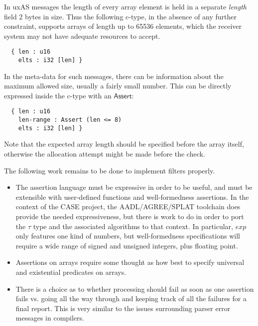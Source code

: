 \documentclass[svgnames]{llncs}
\newcommand{\konst}[1]{\ensuremath{\mathsf{#1}}}
\begin{document}
\begin{example}

In uxAS messages the length of every array element is held in a
separate \emph{length} field 2 bytes in size. Thus the following
c-type, in the absence of any further constraint, supports arrays of
length up to 65536 elements, which the receiver system may not have
adequate resources to accept.

\begin{verbatim}
  { len : u16
    elts : i32 [len] }
\end{verbatim}

\noindent In the meta-data for such messages, there can be information
about the maximum allowed size, usually a fairly small number. This
can be directly expressed inside the c-type with an \konst{Assert}:

\begin{verbatim}
  { len : u16
    len-range : Assert (len <= 8)
    elts : i32 [len] }
\end{verbatim}

\noindent Note that the expected array length should be specified
before the array itself, otherwise the allocation attempt might be
made before the check.
\end{example}


\noindent The following work remains to be done to implement filters
properly.

\begin{itemize}

\item The assertion language must be expressive in order to be useful,
  and must be extensible with user-defined functions and
  well-formedness assertions. In the context of the CASE project, the
  AADL/AGREE/SPLAT toolchain does provide the needed expressiveness,
  but there is work to do in order to port the $\tau$ type and the
  associated algorithms to that context. In particular, $\mathit{exp}$
  only features one kind of numbers, but well-formedness
  specifications will require a wide range of signed and unsigned
  integers, plus floating point.

\item Assertions on arrays require some thought as how best to specify
  universal and existential predicates on arrays.

\item There is a choice as to whether processing should fail as soon
  as one assertion fails vs. going all the way through and keeping
  track of all the failures for a final report. This is very similar
  to the issues surrounding parser error messages in compilers.

\end{itemize}
\end{document}
